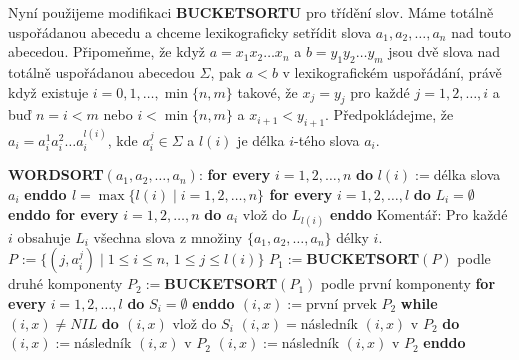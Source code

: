 \documentclass[a4paper,12pt]{article}
\begin{document}
Nyní použijeme modifikaci {\bf BUCKETSORTU} pro 
třídění slov.  Máme totálně 
uspořádanou abecedu a chceme lexikograficky setřídit slova 
$a_1,a_2,\dots,a_n$ nad touto abecedou. Připo\-meň\-me, že když 
$a=x_1x_2\dots x_n$ a $b=y_1y_2\dots y_m$ jsou dvě slova nad totálně 
uspořá\-danou abecedou $\Sigma$, pak $a<b$ v lexikografickém 
uspořádání, právě když existuje $i=0,1,\dots,\min
\{n,m\}$ takové, že 
$x_j=y_j$  pro každé $j=1,2,\dots,i$ a buď $n=i<m$ nebo $
i<\min\{n,m\}$ 
a $x_{i+1}<y_{i+1}$. Předpokládejme, že $a_i=a_i^1a_i^2\dots 
a_i^{l(i)}$, kde 
$a_i^j\in\Sigma$ a $l(i)$ je délka $i$-tého slova $a_i$.

{\bf WORDSORT$(a_1,a_2,\dots,a_n)$}:\newline 
{\bf \textsf{for every}} $i=1,2,\dots,n$ {\bf do} $l(i):=$délka slova $a_
i$ {\bf enddo\newline 
$l=\max\{l(i)\mid i=1,2,\dots,n\}$\newline 
\textsf{for every}} $i=1,2,\dots,l$ {\bf do} $L_i=\emptyset$ {\bf enddo\newline 
\textsf{for every}} $i=1,2,\dots,n$ {\bf do\newline 
\phantom{{\rm---}}$a_i$} vlož do $L_{l(i)}$\newline 
{\bf enddo\newline}
Komentář: Pro každé $i$ obsahuje $L_i$ všechna slova z množiny 
$\{a_1,a_2,\dots,a_n\}$ délky $i$.\newline 
$P_{}:=\{(j,a_i^j)\mid 1\le i\le n,\,1\le j\le l(i)\}$\newline 
$P_1:=${\bf BUCKETSORT$(P)$} podle druhé komponenty\newline 
$P_2:=${\bf BUCKETSORT$(P_1)$} podle první komponenty\newline 
{\bf \textsf{for every}} $i=1,2,\dots,l$ {\bf do} $S_i=\emptyset$ {\bf enddo\newline 
$(i,x):=$}první prvek $P_2$\newline 
{\bf while} $(i,x)\ne NIL$ {\bf do\newline 
\phantom{{\rm---}}$(i,x)$} vlož do $S_i$\newline 
\phantom{---}{\bf while}$(i,x)=$následník $(i,x)$ v $P_2$ {\bf do}\newline
\phantom{{\rm------}}$(i,x):=$následník $(i,x)$ v $P_2$\newline 
{}\newline
\phantom{---}$(i,x):=$následník $(i,x)$ v $P_2$\newline 
{\bf enddo}\newline
\end{document}
